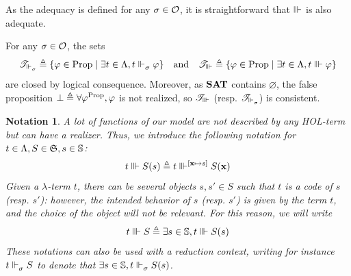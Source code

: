 \documentclass[a4paper,UKenglish,cleveref, autoref, thm-restate]{lipics-v2021}
\newtheorem{notation}[definition]{Notation}
\newlength{\mysep}
\newlength{\myl}
\newcommand{\twoelt}[2]{
  \settowidth{\myl}{$#1$}
  \setlength{\mysep}{0.5\textwidth}
  \addtolength{\mysep}{-\myl}
  \addtolength{\mysep}{-15pt}
\[
  #1
  \hspace{\mysep}
  #2
\]
}
\begin{document}
As the adequacy is defined for any $\sigma\in\mathcal O$, it is straightforward that $\Vvdash$ is also adequate.


\begin{corollary}
For any $\sigma\in\mathcal O$, the sets
\[\mathscr T_{\Vdash_{\sigma}^{}} \triangleq \{ \varphi \in \mathrm{Prop} \mid \exists t \in \Lambda, t \Vdash_{\sigma}^{} \varphi\}
 \quad\text{and}\quad \mathscr T_{\Vvdash} \triangleq \{ \varphi \in \mathrm{Prop} \mid \exists t \in \Lambda, t \Vvdash \varphi\}\]
are closed by logical consequence. Moreover, as ${\mathbf{SAT}}$ contains $\varnothing$,
the false proposition $\bot \triangleq \forall \varphi^{\mathrm{Prop}}, \varphi$
is not realized, so $\mathscr T_{\Vvdash}$ (resp. $\mathscr T_{\Vdash_{\sigma}^{}}$) is consistent.
\end{corollary}

\begin{notation}
  A lot of functions of our model are not described by any HOL-term but can have a realizer. Thus, we introduce the following notation for $t \in \Lambda, S \in \mathfrak S, s \in \mathbb S$:
  \[t \Vvdash S(s) \triangleq t \Vvdash^{[\mathbf{x} \mapsto s]} S(\mathbf{x})\]
  Given a $\lambda$-term $t$, there can be several objects $s,s' \in S$ such that $t$ is a code of $s$ (resp. $s'$): however, the intended behavior of $s$ (resp. $s'$) is given by the term $t$, and the choice of the object will not be relevant. For this reason, we will write
  \[t \Vvdash S \triangleq \exists s \in \mathbb S, t \Vvdash S(s)\]
  These notations can also be used with a reduction context, writing for instance $t\Vdash_{\sigma}^{} S$ to denote that $\exists s \in \mathbb S, t \Vdash_{\sigma}^{} S(s)$.
\end{notation}
\end{document}
